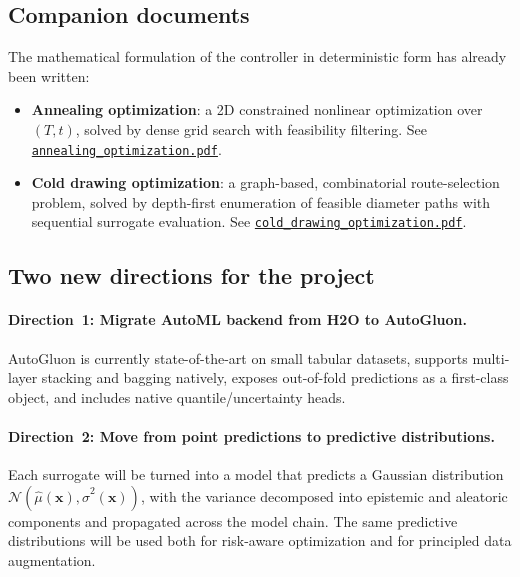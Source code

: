 \documentclass[11pt,a4paper]{article}
\begin{document}
\subsection{Companion documents}

The mathematical formulation of the controller in deterministic form has already been written:
\begin{itemize}
    \item \textbf{Annealing optimization}: a 2D constrained nonlinear optimization over $(T,t)$, solved by dense grid search with feasibility filtering. See \href{https://drive.google.com/file/d/1dMrTbz4iGtGpthyRBU4M1-V0mrxIWbfK/view?usp=drive_link}{\texttt{annealing\_optimization.pdf}}.
    \item \textbf{Cold drawing optimization}: a graph-based, combinatorial route-selection problem, solved by depth-first enumeration of feasible diameter paths with sequential surrogate evaluation. See \href{https://drive.google.com/file/d/1CmDZxgh3cOcopIMbxvVBxugg_9li79cP/view?usp=drive_link}{\texttt{cold\_drawing\_optimization.pdf}}.
\end{itemize}

\subsection{Two new directions for the project}

\paragraph{Direction~1: Migrate AutoML backend from H2O to AutoGluon.} AutoGluon is currently state-of-the-art on small tabular datasets, supports multi-layer stacking and bagging natively, exposes out-of-fold predictions as a first-class object, and includes native quantile/uncertainty heads.

\paragraph{Direction~2: Move from point predictions to predictive distributions.} Each surrogate will be turned into a model that predicts a Gaussian distribution $\mathcal{N}(\hat\mu(\bm x), \hat\sigma^2(\bm x))$, with the variance decomposed into epistemic and aleatoric components and propagated across the model chain. The same predictive distributions will be used both for risk-aware optimization and for principled data augmentation.

\newpage
\end{document}
